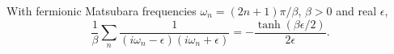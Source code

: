 \documentclass{article}
\begin{document}
With fermionic Matsubara frequencies $\omega_n = (2n+1)\pi/\beta$, $\beta>0$ and real $\epsilon$,
\begin{equation}
\frac{1}{\beta}\sum_{n} \frac{1}{(i\omega_n-\epsilon)(i\omega_n+\epsilon)} = -\frac{\tanh(\beta\epsilon/2)}{2\epsilon} .
\label{eq:s}
\end{equation}
\end{document}
